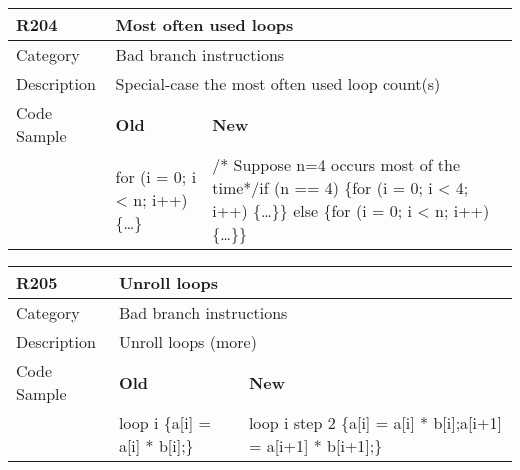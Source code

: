 \begin{tabular}{|p{0.9in}|p{2.0in}|p{2.0in}|} \hline
\textbf{R204}       & \multicolumn{2}{|p{4.0in}|}{\textbf{Most often used loops}} \\ \hline
Category            & \multicolumn{2}{|p{4.0in}|}{Bad branch instructions} \\ \hline
Description         & \multicolumn{2}{|p{4.0in}|}{Special-case the most often used loop count(s)} \\ \hline
Code Sample         & \textbf{Old} & \textbf{New} \\ \hline
                    & for (i = 0; i <{} n; i++)\newline \{\ldots\}
                    & /* Suppose n=4 occurs most of the time*/\newline if (n == 4) \{\newline   for (i = 0; i <{} 4; i++) \newline     \{\ldots\}\newline \} else \{\newline   for (i = 0; i <{} n; i++) \newline     \{\ldots\}\newline \} \\ \hline
\end{tabular}

\begin{tabular}{|p{0.9in}|p{2.0in}|p{2.0in}|} \hline
\textbf{R205}       & \multicolumn{2}{|p{4.0in}|}{\textbf{Unroll loops}} \\ \hline
Category            & \multicolumn{2}{|p{4.0in}|}{Bad branch instructions} \\ \hline
Description         & \multicolumn{2}{|p{4.0in}|}{Unroll loops (more)} \\ \hline
Code Sample         & \textbf{Old} & \textbf{New} \\ \hline
                    & loop i \{\newline   a[i] = a[i] * b[i];\newline \}
                    & loop i step 2 \{\newline   a[i] = a[i] * b[i];\newline   a[i+1] = a[i+1] * b[i+1];\newline \} \\ \hline
\end{tabular}

